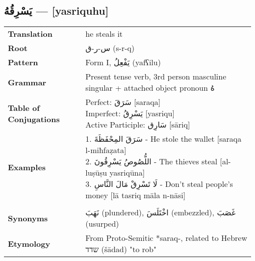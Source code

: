 \documentclass[letter,12pt]{article}
\begin{document}
\subsection{\textarabic{يَسْرِقُهُ} — [yasriquhu]}
\begin{tabular}{p{3cm}p{10cm}}
\toprule

\textbf{Translation} & he steals it \\
\textbf{Root} & \textarabic{س-ر-ق} (s-r-q) \\
\textbf{Pattern} & Form I, \textarabic{يَفْعِلُ} (yafʕilu) \\
\textbf{Grammar} & Present tense verb, 3rd person masculine singular + attached object pronoun \textarabic{هُ} \\
\textbf{Table of Conjugations} & \makecell[l]{
Perfect: \textarabic{سَرَقَ} [saraqa]\\
Imperfect: \textarabic{يَسْرِقُ} [yasriqu]\\
Active Participle: \textarabic{سَارِق} [sāriq]
} \\
\textbf{Examples} & \makecell[l]{\parbox{9.5cm}{
1. \textarabic{سَرَقَ المِحْفَظَةَ} - He stole the wallet [saraqa l-miħfaẓata]\\
2. \textarabic{اللُّصُوصُ يَسْرِقُونَ} - The thieves steal [al-luṣūṣu yasriqūna]\\
3. \textarabic{لَا تَسْرِقْ مَالَ النَّاسِ} - Don't steal people's money [lā tasriq māla n-nāsi]
}} \\
\midrule \\
\textbf{Synonyms} & \textarabic{نَهَبَ} (plundered), \textarabic{اخْتَلَسَ} (embezzled), \textarabic{غَصَبَ} (usurped) \\
\textbf{Etymology} & From Proto-Semitic *saraq-, related to Hebrew \texthebrew{שדד} (šādad) "to rob" \\
\bottomrule
\end{tabular}
\end{document}
